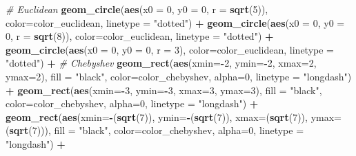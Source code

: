 \documentclass[]{article}
\newenvironment{Shaded}{\begin{snugshade}}{\end{snugshade}}
\newcommand{\CommentTok}[1]{\textcolor[rgb]{0.56,0.35,0.01}{\textit{#1}}}
\newcommand{\DataTypeTok}[1]{\textcolor[rgb]{0.13,0.29,0.53}{#1}}
\newcommand{\DecValTok}[1]{\textcolor[rgb]{0.00,0.00,0.81}{#1}}
\newcommand{\KeywordTok}[1]{\textcolor[rgb]{0.13,0.29,0.53}{\textbf{#1}}}
\newcommand{\NormalTok}[1]{#1}
\newcommand{\OperatorTok}[1]{\textcolor[rgb]{0.81,0.36,0.00}{\textbf{#1}}}
\newcommand{\StringTok}[1]{\textcolor[rgb]{0.31,0.60,0.02}{#1}}
\begin{document}
\begin{Shaded}
\begin{Highlighting}[]
\StringTok{ }\CommentTok{# Euclidean}
\StringTok{  }\KeywordTok{geom_circle}\NormalTok{(}\KeywordTok{aes}\NormalTok{(}\DataTypeTok{x0 =} \DecValTok{0}\NormalTok{, }\DataTypeTok{y0 =} \DecValTok{0}\NormalTok{, }\DataTypeTok{r =} \KeywordTok{sqrt}\NormalTok{(}\DecValTok{5}\NormalTok{)),  }\DataTypeTok{color=}\NormalTok{color_euclidean, }\DataTypeTok{linetype =} \StringTok{"dotted"}\NormalTok{) }\OperatorTok{+}
\StringTok{  }\KeywordTok{geom_circle}\NormalTok{(}\KeywordTok{aes}\NormalTok{(}\DataTypeTok{x0 =} \DecValTok{0}\NormalTok{, }\DataTypeTok{y0 =} \DecValTok{0}\NormalTok{, }\DataTypeTok{r =} \KeywordTok{sqrt}\NormalTok{(}\DecValTok{8}\NormalTok{)),  }\DataTypeTok{color=}\NormalTok{color_euclidean, }\DataTypeTok{linetype =} \StringTok{"dotted"}\NormalTok{) }\OperatorTok{+}
\StringTok{  }\KeywordTok{geom_circle}\NormalTok{(}\KeywordTok{aes}\NormalTok{(}\DataTypeTok{x0 =} \DecValTok{0}\NormalTok{, }\DataTypeTok{y0 =} \DecValTok{0}\NormalTok{, }\DataTypeTok{r =} \DecValTok{3}\NormalTok{),  }\DataTypeTok{color=}\NormalTok{color_euclidean, }\DataTypeTok{linetype =} \StringTok{"dotted"}\NormalTok{) }\OperatorTok{+}
\StringTok{  }\CommentTok{# Chebyshev}
\StringTok{  }\KeywordTok{geom_rect}\NormalTok{(}\KeywordTok{aes}\NormalTok{(}\DataTypeTok{xmin=}\OperatorTok{-}\DecValTok{2}\NormalTok{, }\DataTypeTok{ymin=}\OperatorTok{-}\DecValTok{2}\NormalTok{, }\DataTypeTok{xmax=}\DecValTok{2}\NormalTok{, }\DataTypeTok{ymax=}\DecValTok{2}\NormalTok{), }\DataTypeTok{fill =} \StringTok{"black"}\NormalTok{, }\DataTypeTok{color=}\NormalTok{color_chebyshev, }\DataTypeTok{alpha=}\DecValTok{0}\NormalTok{, }\DataTypeTok{linetype =} \StringTok{"longdash"}\NormalTok{) }\OperatorTok{+}
\StringTok{  }\KeywordTok{geom_rect}\NormalTok{(}\KeywordTok{aes}\NormalTok{(}\DataTypeTok{xmin=}\OperatorTok{-}\DecValTok{3}\NormalTok{, }\DataTypeTok{ymin=}\OperatorTok{-}\DecValTok{3}\NormalTok{, }\DataTypeTok{xmax=}\DecValTok{3}\NormalTok{, }\DataTypeTok{ymax=}\DecValTok{3}\NormalTok{), }\DataTypeTok{fill =} \StringTok{"black"}\NormalTok{, }\DataTypeTok{color=}\NormalTok{color_chebyshev, }\DataTypeTok{alpha=}\DecValTok{0}\NormalTok{, }\DataTypeTok{linetype =} \StringTok{"longdash"}\NormalTok{) }\OperatorTok{+}
\StringTok{  }\KeywordTok{geom_rect}\NormalTok{(}\KeywordTok{aes}\NormalTok{(}\DataTypeTok{xmin=}\OperatorTok{-}\NormalTok{(}\KeywordTok{sqrt}\NormalTok{(}\DecValTok{7}\NormalTok{)), }\DataTypeTok{ymin=}\OperatorTok{-}\NormalTok{(}\KeywordTok{sqrt}\NormalTok{(}\DecValTok{7}\NormalTok{)), }\DataTypeTok{xmax=}\NormalTok{(}\KeywordTok{sqrt}\NormalTok{(}\DecValTok{7}\NormalTok{)), }\DataTypeTok{ymax=}\NormalTok{(}\KeywordTok{sqrt}\NormalTok{(}\DecValTok{7}\NormalTok{))), }\DataTypeTok{fill =} \StringTok{"black"}\NormalTok{, }\DataTypeTok{color=}\NormalTok{color_chebyshev, }\DataTypeTok{alpha=}\DecValTok{0}\NormalTok{, }\DataTypeTok{linetype =} \StringTok{"longdash"}\NormalTok{) }\OperatorTok{+}

\end{Highlighting}
\end{Shaded}
\end{document}
